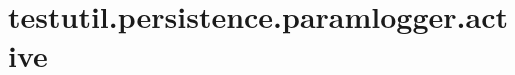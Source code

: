 \section{testutil.persistence.paramlogger.active}
\label{configuration:TestutilPersistenceParamloggerActive}
\AvailableInJavaOnly{\TODO}
